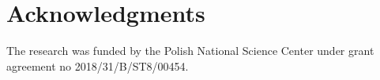 \documentclass{IOS-Book-Article}
\begin{document}
%	
%	
%	
%	
%	
%	
%	
%	
%
%	
\section*{Acknowledgments}
The research was funded by the Polish National Science Center under grant agreement no 2018/31/B/ST8/00454.



\end{document}
